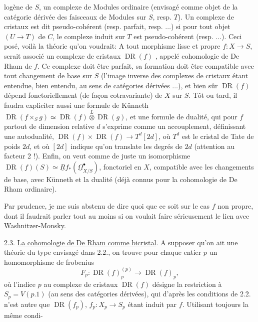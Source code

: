 logène  de $S$, un complexe de Modules ordinaire (envisagé comme objet de la catégorie dérivée des faisceaux de Modules sur $S$, resp. $T$). Un complexe de cristaux est dit pseudo-cohérent (resp. parfait, resp. $\ldots$) si pour tout objet $(U\to T)$ de $C$, le complexe induit sur $T$ est pseudo-cohérent (resp. $\ldots$). Ceci posé, voilà la théorie qu'on voudrait: A tout morphisme lisse et propre $f:X\to S$, serait associé un complexe de cristaux  $\operatorname{DR}(f)$ , appelé cohomologie de De Rham  de $f$.  Ce complexe doit être parfait, sa formation doit être compatible avec tout changement de base sur $S$ (l'image inverse des complexes de cristaux étant entendue, bien entendu, au sens de catégories dérivées $\ldots$), et bien sûr $\operatorname{DR}(f)$ dépend fonctoriellement (de façon cotravariante) de $X$ sur $S$. Tôt ou tard, il faudra expliciter aussi une formule de Künneth $\operatorname{DR}(f\times_Sg)\simeq\operatorname{DR}(f)\overset{L}{\otimes}\operatorname{DR}(g)$, et une formule de dualité, qui pour $f$ partout de dimension relative $d$ s'exprime comme un accouplement, définissant une autodualité, $\operatorname{DR}(f)\times\operatorname{DR}(f)\longrightarrow T^d[2d]$, où $T^d$ est le cristal de Tate de poids $2d$, et où $[2d]$ indique qu'on translate les degrés de $2d$ (attention au facteur 2 !). Enfin, on veut comme de juste un isomorphisme $\operatorname{DR}(f)(S)\simeq\underline{R}f_*(\underline{\Omega}^{\bullet}_{X/S})$, fonctoriel en $X$, compatible avec les changements de base, avec Künneth et la dualité (déjà connus pour la cohomologie de De Rham ordinaire).

Par prudence, je me suis abstenu de dire quoi que ce soit sur le cas $f$ non propre, dont il faudrait parler tout au moins si on voulait faire sérieusement le lien avec Washnitzer-Monsky.

2.3. \uline{La cohomologie de De Rham comme bicristal}. A supposer qu'on ait une théorie du type envisagé dans 2.2.,  on trouve pour chaque entier $p$ un homomorphisme de frobenius
\[
F_p:\operatorname{DR}(f)_p^{(p)}\longrightarrow\operatorname{DR}(f)_p,
\]
où l'indice $p$ au complexe de cristaux $\operatorname{DR}(f)$ désigne la restriction à $S_p=V(p.1)$ (au sens des catégories dérivées), qui d'après les conditions de 2.2. n'est autre que $\operatorname{DR}(f_p)$, $f_p:X_p\longrightarrow S_p$ étant induit par $f$. Utilisant toujours la même condi-


